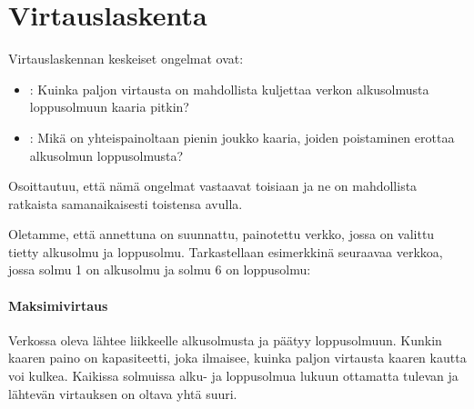 \chapter{Virtauslaskenta}

Virtauslaskennan keskeiset ongelmat ovat:

\begin{itemize}
\item {}:
Kuinka paljon virtausta on mahdollista kuljettaa
verkon alkusolmusta loppusolmuun kaaria pitkin?
\item {}:
Mikä on yhteispainoltaan pienin joukko kaaria,
joiden poistaminen erottaa alkusolmun loppusolmusta?
\end{itemize}

Osoittautuu, että nämä ongelmat vastaavat toisiaan
ja ne on mahdollista ratkaista samanaikaisesti
toistensa avulla.

Oletamme, että annettuna on suunnattu,
painotettu verkko, 
jossa on valittu tietty alkusolmu ja loppusolmu.
Tarkastellaan esimerkkinä seuraavaa verkkoa,
jossa solmu 1 on alkusolmu ja solmu 6 on loppusolmu:

\begin{center}
\end{center}

\subsubsection{Maksimivirtaus}


Verkossa oleva 
lähtee liikkeelle alkusolmusta ja päätyy loppusolmuun.
Kunkin kaaren paino on kapasiteetti,
joka ilmaisee, kuinka paljon virtausta kaaren
kautta voi kulkea.
Kaikissa solmuissa alku- ja loppusolmua lukuun ottamatta
tulevan ja lähtevän virtauksen on oltava yhtä suuri.

